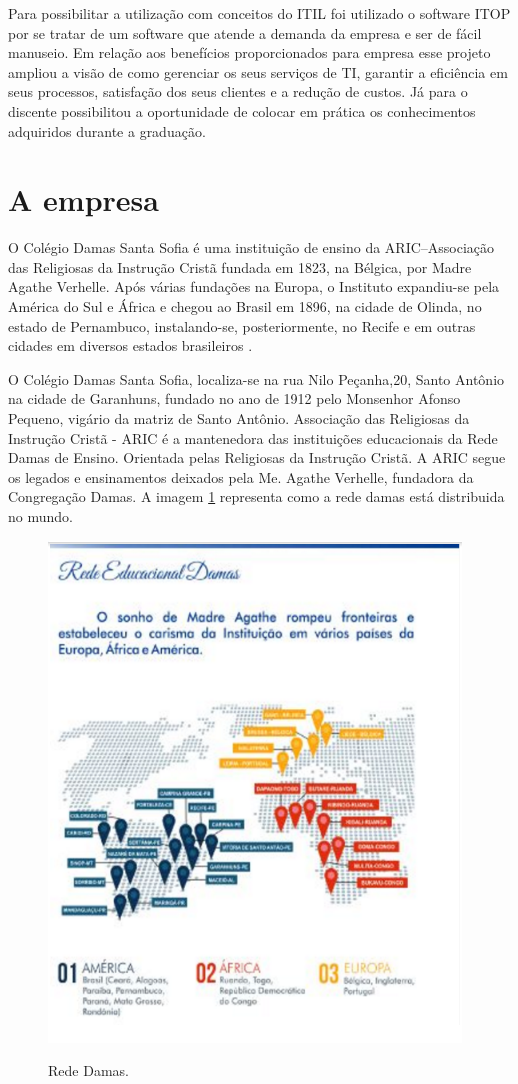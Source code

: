 \documentclass[eso]{bcc}
\begin{document}
Para possibilitar a utilização com conceitos do ITIL foi utilizado o software ITOP  por se tratar de um software que atende a demanda da empresa e ser de fácil manuseio. Em relação aos benefícios proporcionados para empresa esse projeto ampliou a visão de como gerenciar os seus serviços de TI, garantir a eficiência em seus processos, satisfação dos seus clientes e a redução de custos. Já para o discente possibilitou  a oportunidade de colocar em prática os conhecimentos adquiridos durante a graduação. 

\section{A empresa}
O Colégio Damas Santa Sofia  é uma instituição de ensino da ARIC–Associação das Religiosas da Instrução Cristã fundada em 1823, na Bélgica, por Madre Agathe Verhelle. Após várias fundações na Europa, o Instituto expandiu-se pela América do Sul e África e chegou ao Brasil em 1896, na cidade de Olinda, no estado de Pernambuco, instalando-se, posteriormente, no Recife e em outras cidades em diversos estados brasileiros . 

O Colégio Damas Santa Sofia, localiza-se na rua Nilo Peçanha,20, Santo Antônio na cidade de Garanhuns, fundado no ano de 1912 pelo Monsenhor Afonso Pequeno, vigário da matriz de Santo Antônio. Associação das Religiosas da Instrução Cristã - ARIC é a mantenedora das instituições educacionais da Rede Damas de Ensino. Orientada pelas Religiosas da Instrução Cristã. A ARIC segue os legados e ensinamentos deixados pela Me. Agathe Verhelle, fundadora da Congregação Damas.
A imagem \ref{UCrede} representa como a rede damas está distribuida no mundo.

\newpage

\begin{figure}[!h]
\centering
\caption[Rede Damas]{Rede Damas.}
\includegraphics[scale=1.3]{Figuras/rededamas.png}
\label{UCrede}
\end{figure}
\end{document}
